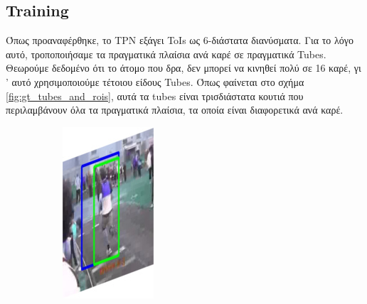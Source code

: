\documentclass{report}
\begin{document}
\subsection{Training}
Όπως προαναφέρθηκε, το TPN εξάγει ToIs ως 6-διάστατα διανύσματα. Για το λόγο αυτό, τροποποιήσαμε τα πραγματικά πλαίσια ανά καρέ σε πραγματικά Tubes.
Θεωρούμε δεδομένο ότι το άτομο που δρα, δεν μπορεί να κινηθεί πολύ σε 16 καρέ, γι ' αυτό χρησιμοποιούμε τέτοιου είδους Tubes. Όπως φαίνεται 
στο σχήμα \ref{fig:gt_tubes_and_rois}, αυτά τα tubes είναι τρισδιάστατα κουτιά που περιλαμβάνουν όλα τα πραγματικά πλαίσια, τα οποία είναι διαφορετικά
ανά καρέ.
\begin{figure}[h]
  \centering
  \begin{subfigure}{0.15\textwidth}
    \includegraphics[width=\textwidth]{output/img_0.jpg}

\end{subfigure}
\end{figure}
\end{document}
